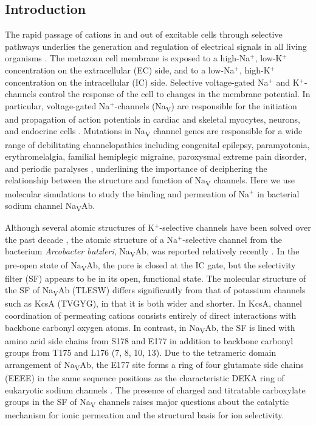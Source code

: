 \begin{refsection}
\section{Introduction}

The rapid passage of cations in and out of excitable cells through selective pathways underlies the generation and regulation of electrical signals in all living organisms \cite{Bezanilla:2008ht,Catterall:2000vb,Catterall:2012fh,Hille:2001tw}. The metazoan cell membrane is exposed to a high-Na$^+$, low-K$^+$ concentration on the extracellular (EC) side, and to a low-Na$^+$, high-K$^+$ concentration on the intracellular (IC) side. Selective voltage-gated Na$^+$ and K$^+$-channels control the response of the cell to changes in the membrane potential.  In particular, voltage-gated Na$^+$-channels (Na\textsubscript{V}) are responsible for the initiation and propagation of action potentials in cardiac and skeletal myocytes, neurons, and endocrine cells \cite{Bezanilla:2008ht,Catterall:2000vb,Catterall:2012fh,Hille:2001tw}. Mutations in Na\textsubscript{V} channel genes are responsible for a wide range of debilitating channelopathies including congenital epilepsy, paramyotonia, erythromelalgia, familial hemiplegic migraine, paroxysmal extreme pain disorder, and periodic paralyses  \cite{George:2005fm,Catterall:2010kr}, underlining the importance of deciphering the relationship between the structure and function of Na\textsubscript{V} channels.  Here we use molecular simulations to study the binding and permeation of Na$^+$ in bacterial sodium channel Na\textsubscript{V}Ab.

Although several atomic structures of K$^+$-selective channels have been solved over the past decade \cite{Doyle:1998wq,Jiang:2003vh,Jiang:2003je}, the atomic structure of a Na$^+$-selective channel from the bacterium \textit{Arcobacter butzleri}, Na\textsubscript{V}Ab, was reported relatively recently \cite{Payandeh:2012ib}.  In the pre-open state of Na\textsubscript{V}Ab, the pore is closed at the IC gate, but the selectivity filter (SF) appears to be in its open, functional state.  The molecular structure of the SF of Na\textsubscript{V}Ab (TLESW) differs significantly from that of potassium channels such as KcsA (TVGYG), in that it is both wider and shorter.  In KcsA, channel coordination of permeating cations consists entirely of direct interactions with backbone carbonyl oxygen atoms.  In contrast, in Na\textsubscript{V}Ab, the SF is lined with amino acid side chains from S178 and E177 in addition to backbone carbonyl groups from T175 and L176 (7, 8, 10, 13). Due to the tetrameric domain arrangement of Na\textsubscript{V}Ab, the E177 site forms a ring of four glutamate side chains (EEEE) in the same sequence positions as the characteristic DEKA ring of eukaryotic sodium channels \cite{Heinemann:1992ep,Terlau:1991ud}. The presence of charged and titratable carboxylate groups in the SF of Na\textsubscript{V} channels raises major questions about the catalytic mechanism for ionic permeation and the structural basis for ion selectivity. 


\end{refsection}
